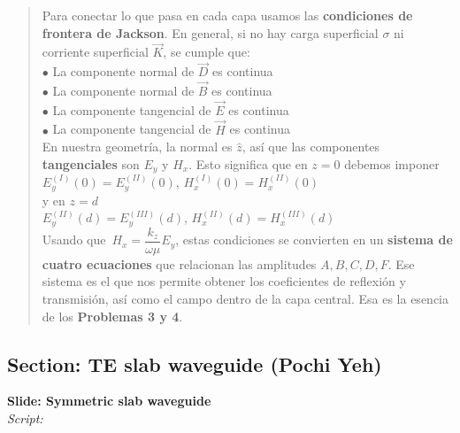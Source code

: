 \documentclass{article}
\begin{document}
\begin{quote}
Para conectar lo que pasa en cada capa usamos las \textbf{condiciones de frontera de Jackson}. 
En general, si no hay carga superficial \(\sigma\) ni corriente superficial \(\vec{K}\), se cumple que:\\[1mm]
\(\bullet\) La componente normal de \(\vec{D}\) es continua\\
\(\bullet\) La componente normal de \(\vec{B}\) es continua\\
\(\bullet\) La componente tangencial de \(\vec{E}\) es continua\\
\(\bullet\) La componente tangencial de \(\vec{H}\) es continua\\[2mm]
En nuestra geometría, la normal es \(\hat{z}\), así que las componentes \textbf{tangenciales} 
son \(E_y\) y \(H_x\). Esto significa que en \(z=0\) debemos imponer\\[1mm]
\(E_y^{(I)}(0) = E_y^{(II)}(0)\), \quad \(H_x^{(I)}(0) = H_x^{(II)}(0)\)\\[2mm]
y en \(z=d\)\\[1mm]
\(E_y^{(II)}(d) = E_y^{(III)}(d)\), \quad \(H_x^{(II)}(d) = H_x^{(III)}(d)\)\\[2mm]
Usando que \(\,H_x = \dfrac{k_z}{\omega\mu} E_y\), estas condiciones se convierten en un 
\textbf{sistema de cuatro ecuaciones} que relacionan las amplitudes \(A,B,C,D,F\). Ese sistema 
es el que nos permite obtener los coeficientes de reflexión y transmisión, así como el campo 
dentro de la capa central. Esa es la esencia de los \textbf{Problemas 3 y 4}.
\end{quote}

\vspace{0.8cm}

\subsection*{Section: TE slab waveguide (Pochi Yeh)}

\noindent
\textbf{Slide: Symmetric slab waveguide}\\[2mm]
\textit{Script:}\\[2mm]
\end{document}
